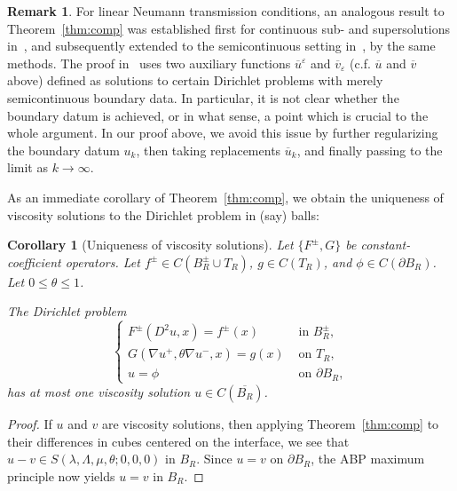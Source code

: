 \documentclass[letter,11pt]{amsart}
\newcommand{\vep}{\varepsilon}
\newtheorem{cor}[thm]{Corollary}
\theoremstyle{definition}
\newtheorem{rem}[thm]{Remark}
\numberwithin{equation}{section}
\begin{document}
\medskip

\begin{rem}
\label{rem:mistake}
For linear Neumann transmission conditions, an analogous result to Theorem~\ref{thm:comp} was established first for continuous sub- and supersolutions in~\cite{DFSfb,DFS}, and subsequently extended to the semicontinuous setting in~\cite{SS}, by the same methods.
The proof in~\cite{SS} uses two auxiliary functions $\overline{u}^{\vep}$ and $\overline{v}_{\vep}$ (c.f. $\overline{u}$ and $\overline{v}$ above) defined as solutions to certain Dirichlet problems with merely semicontinuous boundary data.
In particular, it is not clear whether the boundary datum is achieved, or in what sense, a point which is crucial to the whole argument.
In our proof above, we avoid this issue by further regularizing the boundary datum $u_k$, then taking replacements $\overline{u}_k$, and finally passing to the limit as $k \to \infty$.
\end{rem}

\medskip

As an immediate corollary of Theorem~\ref{thm:comp}, we obtain the uniqueness of viscosity solutions to the Dirichlet problem in (say) balls:

\begin{cor}
[Uniqueness of viscosity solutions]
Let $\{F^{\pm}, G\}$ be constant-coefficient operators.
Let $f^{\pm} \in C(B_R^{\pm}\cup T_R)$, $g \in C(T_R)$, and $\phi \in C(\partial B_R)$.
Let $0 \leq \theta \leq 1$.

The Dirichlet problem 
\[
\begin{cases}
F^{\pm}(D^2 u, x) = f^{\pm}(x) & \text{ in } B^{\pm}_R,\\
G(\nabla u^{+}, \theta \nabla u^{-}, x) = g(x) & \text{ on } T_R,\\
u = \phi & \text{ on } \partial B_R,
\end{cases}
\]
has at most one viscosity solution $u \in C(\overline{B_R})$.
\end{cor}
\begin{proof}
If $u$ and $v$ are viscosity solutions, then applying Theorem~\ref{thm:comp} to their differences in cubes centered on the interface, we see that $u- v \in S(\lambda,\Lambda,\mu,\theta;0,0,0)$ in $B_R$.
Since $u = v$ on $\partial B_R$, the ABP maximum principle now yields $u = v$ in $B_R$. 
\end{proof}

\medskip
\end{document}

